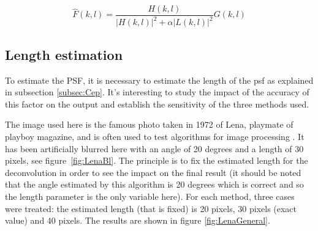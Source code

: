 \begin{equation*}
\hat{F}(k,l) = \frac{H(k,l)}{|H(k,l)|^2 + \alpha |L(k,l)|^2} G(k,l)
\label{eq:FReg}
\end{equation*}

\subsection{Length estimation}
\label{subsec:LengthEs}
To estimate the PSF, it is necessary to estimate the length of the psf  as explained in subsection \ref{subsec:Cep}. It's interesting to study the impact of the accuracy of this factor on the output and establish the sensitivity of the three methods used.

The image used here is the famous photo taken in 1972 of Lena, playmate of playboy magazine, and is often used to test algorithms for image processing \cite{wikiLenna}. It has been artificially blurred here with an angle of 20 degrees and a length of 30 pixels, see figure~\ref{fig:LenaBl}. The principle is to fix the estimated length for the deconvolution in order to see the impact on the final result (it should be noted that the angle estimated by this algorithm is 20 degrees which is correct and so the length parameter is the only variable here). For each method, three cases were treated: the estimated length (that is fixed) is 20 pixels, 30 pixels (exact value) and 40 pixels.  The results are shown in figure \ref{fig:LenaGeneral}.

